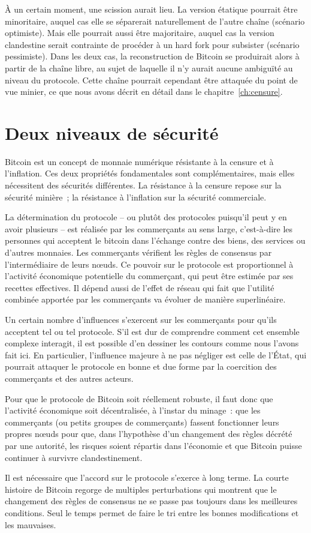 À un certain moment, une scission aurait lieu. La version étatique pourrait être minoritaire, auquel cas elle se séparerait naturellement de l'autre chaîne (scénario optimiste). Mais elle pourrait aussi être majoritaire, auquel cas la version clandestine serait contrainte de procéder à un hard fork pour subsister (scénario pessimiste). Dans les deux cas, la reconstruction de Bitcoin se produirait alors à partir de la chaîne libre, au sujet de laquelle il n'y aurait aucune ambiguïté au niveau du protocole. Cette chaîne pourrait cependant être attaquée du point de vue minier, ce que nous avons décrit en détail dans le chapitre~\ref{ch:censure}.

\vspace{-1em}
\section*{Deux niveaux de sécurité}

Bitcoin est un concept de monnaie numérique résistante à la censure et à l'inflation. Ces deux propriétés fondamentales sont complémentaires, mais elles nécessitent des sécurités différentes. La résistance à la censure repose sur la sécurité minière~; la résistance à l'inflation sur la sécurité commerciale.

La détermination du protocole -- ou plutôt des protocoles puisqu'il peut y en avoir plusieurs -- est réalisée par les commerçants au sens large, c'est-à-dire les personnes qui acceptent le bitcoin dans l'échange contre des biens, des services ou d'autres monnaies. Les commerçants vérifient les règles de consensus par l'intermédiaire de leurs nœuds. Ce pouvoir sur le protocole est proportionnel à l'activité économique potentielle du commerçant, qui peut être estimée par ses recettes effectives. Il dépend aussi de l'effet de réseau qui fait que l'utilité combinée apportée par les commerçants va évoluer de manière superlinéaire.

Un certain nombre d'influences s'exercent sur les commerçants pour qu'ils acceptent tel ou tel protocole. S'il est dur de comprendre comment cet ensemble complexe interagit, il est possible d'en dessiner les contours comme nous l'avons fait ici. En particulier, l'influence majeure à ne pas négliger est celle de l'État, qui pourrait attaquer le protocole en bonne et due forme par la coercition des commerçants et des autres acteurs.

Pour que le protocole de Bitcoin soit réellement robuste, il faut donc que l'activité économique soit décentralisée, à l'instar du minage~: que les commerçants (ou petits groupes de commerçants) fassent fonctionner leurs propres nœuds pour que, dans l'hypothèse d'un changement des règles décrété par une autorité, les risques soient répartis dans l'économie et que Bitcoin puisse continuer à survivre clandestinement.

Il est nécessaire que l'accord sur le protocole s'exerce à long terme. La courte histoire de Bitcoin regorge de multiples perturbations qui montrent que le changement des règles de consensus ne se passe pas toujours dans les meilleures conditions. Seul le temps permet de faire le tri entre les bonnes modifications et les mauvaises.
